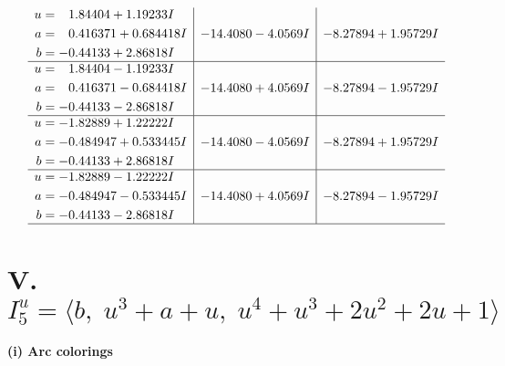 \documentclass[1p]{elsarticle_modified}
\theoremstyle{definition}
\begin{document}
$$\begin{array}{c|c|c}
\begin{aligned}
u &= \phantom{-}1.84404 + 1.19233 I \\
a &= \phantom{-}0.416371 + 0.684418 I \\
b &= -0.44133 + 2.86818 I\end{aligned}
 & -14.4080 - 4.0569 I & -8.27894 + 1.95729 I \\ \hline\begin{aligned}
u &= \phantom{-}1.84404 - 1.19233 I \\
a &= \phantom{-}0.416371 - 0.684418 I \\
b &= -0.44133 - 2.86818 I\end{aligned}
 & -14.4080 + 4.0569 I & -8.27894 - 1.95729 I \\ \hline\begin{aligned}
u &= -1.82889 + 1.22222 I \\
a &= -0.484947 + 0.533445 I \\
b &= -0.44133 + 2.86818 I\end{aligned}
 & -14.4080 - 4.0569 I & -8.27894 + 1.95729 I \\ \hline\begin{aligned}
u &= -1.82889 - 1.22222 I \\
a &= -0.484947 - 0.533445 I \\
b &= -0.44133 - 2.86818 I\end{aligned}
 & -14.4080 + 4.0569 I & -8.27894 - 1.95729 I\\
 \hline 
 \end{array}$$\newpage\newpage\renewcommand{\arraystretch}{1}
\centering \section*{V. $I^u_{5}= \langle b,\;u^3+a+u,\;u^4+u^3+2 u^2+2 u+1 \rangle$}
\flushleft \textbf{(i) Arc colorings}\\
\end{document}

